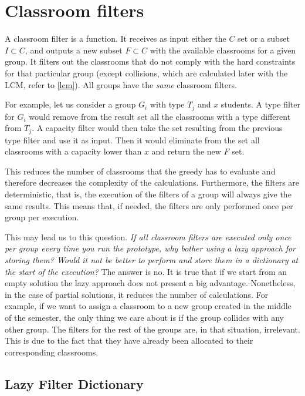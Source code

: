 \section{Classroom filters}\label{classroom-filters}

A classroom filter is a function. It receives as input either the $C$ set or a subset $I \subset C$, and outputs a new subset $F \subset C$ with the available classrooms for a given group. It filters out the classrooms that do not comply with the hard constraints for that particular group (except collisions, which are calculated later with the LCM, refer to \ref{lcm}). All groups have the \textit{same} classroom filters.

For example, let us consider a group $G_{i}$ with type $T_{j}$ and $x$ students. A type filter for $G_{i}$ would remove from the result set all the classrooms with a type different from $T_{j}$. A capacity filter would then take the  set resulting from the previous type filter and use it as input. Then it would eliminate from the set all classrooms with a capacity lower than $x$ and return the new $F$ set.

This reduces the number of classrooms that the greedy has to evaluate and therefore decreases the complexity of the calculations. Furthermore, the filters are deterministic, that is, the execution of the filters of a group will always give the same results. This means that, if needed, the filters are only performed once per group per execution.

This may lead us to this question. \textit{If all classroom filters are executed only once per group every time you run the prototype, why bother using a lazy approach for storing them? Would it not be better to perform and store them in a dictionary at the start of the execution?} The answer is no. It is true that if we start from an empty solution the lazy approach does not present a big advantage. Nonetheless, in the case of partial solutions, it reduces the number of calculations. For example, if we want to assign a classroom to a new group created in the middle of the semester, the only thing we care about is if the group collides with any other group. The filters for the rest of the groups are, in that situation, irrelevant. This is due to the fact that they have already been allocated to their corresponding classrooms.


\subsection{Lazy Filter Dictionary}\label{lfd}

